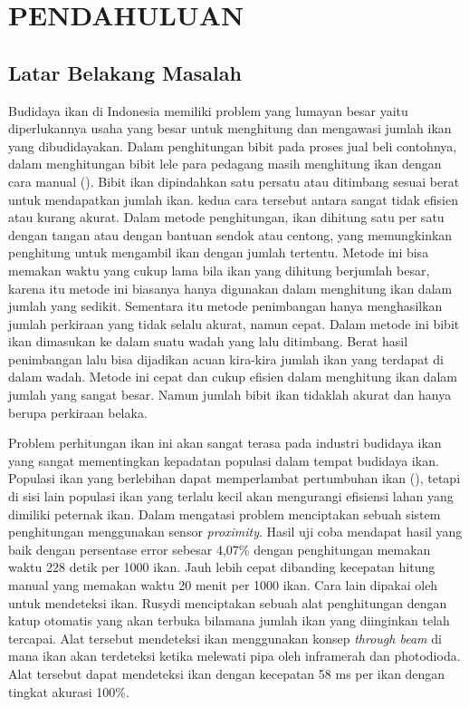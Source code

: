 
\chapter{PENDAHULUAN}

\section{Latar Belakang Masalah}

Budidaya ikan di Indonesia memiliki problem yang lumayan besar yaitu 
diperlukannya usaha yang besar untuk menghitung dan mengawasi jumlah ikan 
yang dibudidayakan. Dalam penghitungan bibit pada proses jual beli contohnya, 
dalam menghitungan bibit lele para pedagang masih menghitung ikan dengan 
cara manual (\cite{alamri}). Bibit ikan dipindahkan satu persatu atau 
ditimbang sesuai berat untuk mendapatkan jumlah ikan. kedua cara tersebut antara 
sangat tidak efisien atau kurang akurat. Dalam metode penghitungan, ikan 
dihitung satu per satu dengan tangan atau dengan bantuan sendok atau centong, 
yang memungkinkan penghitung untuk mengambil ikan dengan jumlah tertentu. 
Metode ini bisa memakan waktu yang cukup lama bila ikan yang dihitung 
berjumlah besar, karena itu metode ini biasanya hanya digunakan 
dalam menghitung ikan dalam jumlah yang sedikit. Sementara itu metode 
penimbangan hanya menghasilkan jumlah perkiraan yang tidak 
selalu akurat, namun cepat. Dalam metode ini bibit ikan dimasukan ke dalam suatu wadah 
yang lalu ditimbang. Berat hasil penimbangan lalu bisa 
dijadikan acuan kira-kira jumlah ikan yang terdapat di dalam wadah. 
Metode ini cepat dan cukup efisien dalam menghitung ikan dalam jumlah yang 
sangat besar. Namun jumlah bibit ikan tidaklah akurat dan hanya berupa perkiraan belaka.

Problem perhitungan ikan ini akan sangat terasa pada industri budidaya ikan yang 
sangat mementingkan kepadatan populasi dalam tempat budidaya ikan. Populasi ikan 
yang berlebihan dapat memperlambat pertumbuhan ikan (\cite{diansarietal}), tetapi 
di sisi lain populasi ikan yang terlalu kecil akan mengurangi efisiensi lahan 
yang dimiliki peternak ikan. Dalam mengatasi problem \cite{alamri} menciptakan 
sebuah sistem penghitungan menggunakan sensor \emph{proximity}. Hasil uji coba mendapat 
hasil yang baik dengan persentase error sebesar 4,07\% dengan penghitungan 
memakan waktu 228 detik per 1000 ikan. Jauh lebih cepat dibanding kecepatan 
hitung manual yang memakan waktu 20 menit per 1000 ikan. Cara lain dipakai 
oleh \cite{rusydi} untuk mendeteksi ikan. Rusydi menciptakan sebuah alat 
penghitungan dengan katup otomatis yang akan terbuka bilamana jumlah ikan 
yang diinginkan telah tercapai. Alat tersebut mendeteksi ikan menggunakan 
konsep \emph{through beam} di mana ikan akan terdeteksi ketika melewati pipa oleh 
inframerah dan photodioda. Alat tersebut dapat mendeteksi ikan dengan 
kecepatan 58 ms per ikan dengan tingkat akurasi 100\%.

